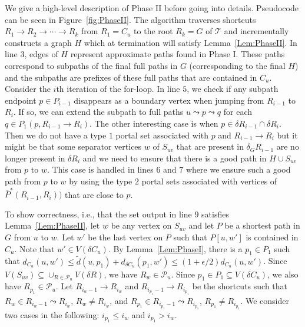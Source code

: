 \documentclass[11pt]{article}
\begin{document}
We give a high-level description of Phase II before going into details.  Pseudocode can be seen in Figure~\ref{fig:PhaseII}. The algorithm traverses shortcuts $R_1\rightarrow R_2\rightarrow\cdots\rightarrow R_k$ from $R_1 = C_u$ to the root $R_k = G$ of $\mathcal T$ and incrementally constructs a graph $H$ which at termination will satisfy Lemma~\ref{Lem:PhaseII}. In line $3$, edges of $H$ represent approximate paths found in Phase I. These paths correspond to subpaths of the final full paths in $G$ (corresponding to the final $H$) and the subpaths are prefixes of these full paths that are contained in $C_u$. Consider the $i$th iteration of the for-loop. In line $5$, we check if any subpath endpoint $p\in P_{i-1}$ disappears as a boundary vertex when jumping from $R_{i-1}$ to $R_i$. If so, we can extend the subpath to full paths $u\leadsto p\leadsto q$ for each $q\in P_1(p,R_{i-1}\rightarrow R_i)$. The other interesting case is when $p\in\delta R_{i-1}\cap\delta R_i$. Then we do not have a type $1$ portal set associated with $p$ and $R_{i-1}\rightarrow R_i$ but it might be that some separator vertices $w$ of $S_{uv}$ that are present in $\delta_G R_{i-1}$ are no longer present in $\delta R_i$ and we need to ensure that there is a good path in $H\cup S_{uv}$ from $p$ to $w$. This case is handled in lines $6$ and $7$ where we ensure such a good path from $p$ to $w$ by using the type $2$ portal sets associated with vertices of $\overline P^*(R_{i-1},R_i))$ that are close to $p$.


To show correctness, i.e., that the set output in line $9$ satisfies Lemma~\ref{Lem:PhaseII}, let $w$ be any vertex on $S_{uv}$ and let $P$ be a shortest path in $G$ from $u$ to $w$. Let $w'$ be the last vertex on $P$ such that $P[u,w']$ is contained in $C_u$. Note that $w'\in V(\delta C_u)$. By Lemma~\ref{Lem:PhaseI}, there is a $p_1\in P_1$ such that $d_{C_u}(u,w')\leq\tilde d(u,p_1) + d_{\delta C_u}(p_1,w')\leq(1+\epsilon/2)d_{C_u}(u,w')$. Since $V(S_{uv})\subseteq\cup_{R\in\mathcal P_u}V(\delta R)$, we have $R_w\in\mathcal P_u$. Since $p_1\in P_1\subseteq V(\delta C_u)$, we also have $R_{p_1}\in\mathcal P_u$. Let $R_{i_w-1}\rightarrow R_{i_w}$ and $R_{i_{p_1}-1}\rightarrow R_{i_{p_1}}$ be the shortcuts such that $R_w\in R_{i_w-1}\leadsto R_{i_w}$, $R_w\neq R_{i_w}$, and $R_{p_1}\in R_{i_{p_1}-1}\leadsto R_{i_{p_1}}$, $R_{p_1}\neq R_{i_{p_1}}$. We consider two cases in the following: $i_{p_1}\leq i_w$ and $i_{p_1} > i_w$.
\end{document}
